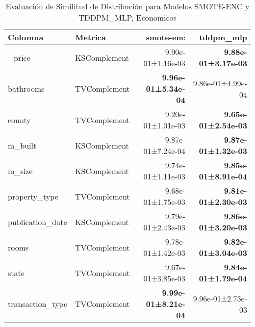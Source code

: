\begin{table}[H]
\centering
\fontsize{10}{14}\selectfont
\caption{Evaluaci\'on de Similitud de Distribuci\'on para Modelos SMOTE-ENC y TDDPM\_MLP, Economicos}
\label{table-shape-economicos-a}
\begin{tabular}{|l|l|r|r|}
\hline
\rowcolor[gray]{0.8}
Columna & Metrica & smote-enc & tddpm\_mlp \\
\hline \_price & KSComplement & 9.90e-01±1.16e-03 & \bfseries 9.88e-01±3.17e-03 \\
\hline bathrooms & TVComplement & \bfseries 9.96e-01±5.34e-04 & 9.86e-01±4.99e-04 \\
\hline county & TVComplement & 9.20e-01±1.01e-03 & \bfseries 9.65e-01±2.54e-03 \\
\hline m\_built & KSComplement & 9.87e-01±7.24e-04 & \bfseries 9.87e-01±1.32e-03 \\
\hline m\_size & KSComplement & 9.74e-01±1.11e-03 & \bfseries 9.85e-01±8.91e-04 \\
\hline property\_type & TVComplement & 9.68e-01±1.75e-03 & \bfseries 9.81e-01±2.30e-03 \\
\hline publication\_date & KSComplement & 9.79e-01±2.43e-03 & \bfseries 9.86e-01±3.20e-03 \\
\hline rooms & TVComplement & 9.78e-01±1.42e-03 & \bfseries 9.82e-01±3.04e-03 \\
\hline state & TVComplement & 9.67e-01±3.85e-03 & \bfseries 9.84e-01±1.79e-04 \\
\hline transaction\_type & TVComplement & \bfseries 9.99e-01±8.21e-04 & 9.96e-01±2.73e-03 \\
\hline
\end{tabular}
\end{table}
